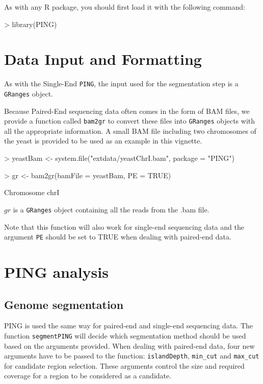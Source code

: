 \documentclass[11pt]{article}
\begin{document}
As with any R package, you should first load it with the following command:

\begin{Schunk}
\begin{Sinput}
> library(PING)
\end{Sinput}
\end{Schunk}

\section{Data Input and Formatting}
As with the Single-End \texttt{PING}, the input used for the segmentation step is a \texttt{GRanges} object.

Because Paired-End sequencing data often comes in the form of BAM files, we provide a function called \texttt{bam2gr} to convert these files into \texttt{GRanges} objects with all the appropriate information.
A small BAM file including two chromosomes of the yeast is provided to be used as an example in this vignette.

\begin{Schunk}
\begin{Sinput}
> yeastBam <- system.file("extdata/yeastChrI.bam", package = "PING")
\end{Sinput}
\end{Schunk}

\begin{Schunk}
\begin{Sinput}
> gr <- bam2gr(bamFile = yeastBam, PE = TRUE)
\end{Sinput}
\begin{Soutput}
Chromosome  chrI 
\end{Soutput}
\end{Schunk}
$gr$ is a \texttt{GRanges} object containing all the reads from the .bam file. 

Note that this function will also work for single-end sequencing data and the argument \texttt{PE} should be set to TRUE when dealing with paired-end data.


\section{PING analysis}

\subsection{Genome segmentation}
PING is used the same way for paired-end and single-end sequencing data. The
function \texttt{segmentPING} will decide which segmentation method should be
used based on the arguments provided. 
When dealing with paired-end data, four new arguments have to be passed to the
function: \texttt{islandDepth}, \texttt{min_cut} 
and \texttt{max_cut} for candidate region selection. These arguments control the 
size and required coverage for a region to be considered as a candidate.
\end{document}
